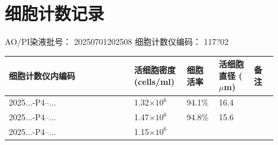 \documentclass[UTF8,10pt,a4paper,fontset=fandol]{ctexart}
\newcommand{\fieldvalue}[1]{#1}
\newcommand{\handwritten}[1]{#1}
\begin{document}
\bigskip

\section*{细胞计数记录}

\noindent
AO/PI染液批号：
\fieldvalue{\handwritten{20250701202508}}
\qquad
细胞计数仪编码：
\fieldvalue{\handwritten{117?02}}

\smallskip

\noindent
\begin{tabular}{|p{0.43\linewidth}|p{0.17\linewidth}|p{0.10\linewidth}|p{0.12\linewidth}|p{0.08\linewidth}|}
\hline
细胞计数仪内编码 & 活细胞密度 (cells/ml) & 细胞活率 & 活细胞直径 ($\mu$m) & 备注 \\
\hline
\fieldvalue{\handwritten{2025...-P4--...}}
&
\fieldvalue{\handwritten{1.32}}$\times 10^{6}$
&
\fieldvalue{\handwritten{94.1}}\%
&
\fieldvalue{\handwritten{16.4}}
&
\\
\hline
\fieldvalue{\handwritten{2025...-P4--...}}
&
\fieldvalue{\handwritten{1.47}}$\times 10^{6}$
&
\fieldvalue{\handwritten{94.8}}\%
&
\fieldvalue{\handwritten{15.6}}
&
\\
\hline
\fieldvalue{\handwritten{2025...-P4--...}}
&
\fieldvalue{\handwritten{1.15}}$\times 10^{6}$
&

\end{tabular}
\end{document}
